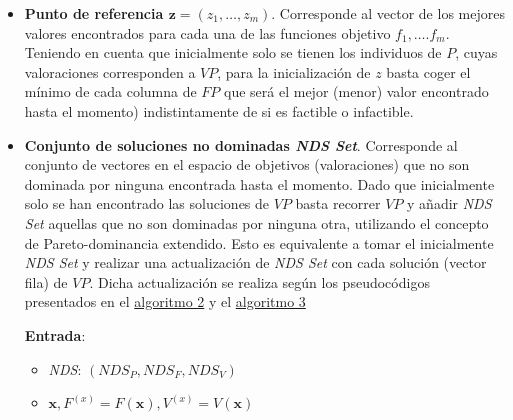 \begin{itemize}
\item \textbf{Punto de referencia $\boldsymbol{z} = (z_1, \dots, z_m)$}. Corresponde al vector de los mejores valores encontrados para cada una de las funciones objetivo $f_1, \dots. f_m$. Teniendo en cuenta que inicialmente solo se tienen los individuos de $P$, cuyas valoraciones corresponden a $VP$, para la inicialización de $z$ basta coger el mínimo de cada columna de $FP$ que será el mejor (menor) valor encontrado hasta el momento) indistintamente de si es factible o infactible.\\

\item \textbf{Conjunto de soluciones no dominadas \textit{NDS Set}}. Corresponde al conjunto de vectores en el espacio de objetivos (valoraciones) que no son dominada por ninguna encontrada hasta el momento. Dado que inicialmente solo se han encontrado las soluciones de $VP$ basta recorrer $VP$ y añadir \textit{NDS Set} aquellas que no son dominadas por ninguna otra, utilizando el concepto de Pareto-dominancia extendido. Esto es equivalente a tomar el inicialmente \textit{NDS Set} y realizar una actualización de \textit{NDS Set} con cada solución (vector fila) de $VP$. Dicha actualización se realiza según los pseudocódigos presentados en el \hyperref[alg:2]{algoritmo 2} y el \hyperref[alg:3]{algoritmo 3}\\

\begin{center}
\begin{minipage}[H]{0.45\linewidth}
    \begin{algorithm}[H]
\SetAlgoLined
 \textbf{Entrada}:
 \begin{itemize}
 
     \vspace{0.15cm}\item \textit{NDS}: $(NDS_P, NDS_F, NDS_V)$	
     
    \vspace{0.15cm}\item $\boldsymbol{x}, F^{(x)} = F(\boldsymbol{x}), V^{(x)} = V(\boldsymbol{x})$
 \end{itemize}
 
 \vspace{0.3cm}
  

\end{algorithm}
\end{minipage}
\end{center}
\end{itemize}
